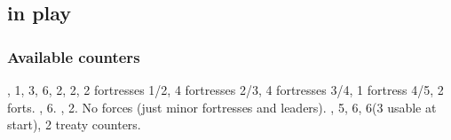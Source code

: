 \subsection{ in play}
\subsubsection{Available counters}
\aparag[Military]
\ARMY, 1\FLEET, 3\LDND, 6\LD, 2\NTD, 2\LDENDE, 
2 fortresses 1/2, 4 fortresses 2/3, 4 fortresses 3/4, 1 fortress 4/5, 2 forts.
\ARMY, 6\LD.
\ARMY, 2\LD.
 No forces (just minor fortresses and leaders).
\COL, 5\TP, 6\MNU, 6\TradeFLEET (3 usable at
start), 2 \ROTW treaty counters.


